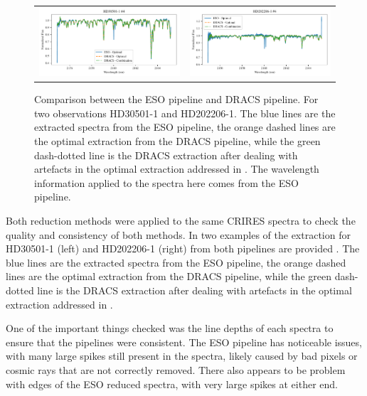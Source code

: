 \begin{figure}
\begin{tabular}{cc}
        \includegraphics[width=0.5\linewidth]{figures/reduction/pipeline_compare/pipeline_compare_HD30501-1_chip_4} & \includegraphics[width=0.5\linewidth]{figures/reduction/pipeline_compare/pipeline_compare_HD202206-1_chip_4}\\
    \end{tabular}
    \caption{Comparison between the {ESO} pipeline and {DRACS} pipeline. For two observations HD30501-1 and HD202206-1. The blue lines are the extracted spectra from the {ESO} pipeline, the orange dashed lines are the optimal extraction from the {DRACS} pipeline, while the green dash-dotted line is the {DRACS} extraction after dealing with artefacts in the optimal extraction addressed in . The wavelength information applied to the spectra here comes from the {ESO} pipeline.}
    \label{fig:reduction-comparison}
\end{figure}

Both reduction methods were applied to the same {CRIRES} spectra to check the quality and consistency of both methods.
In  two examples of the extraction for HD30501-1 (left) and HD202206-1 (right) from both pipelines are provided .
The blue lines are the extracted spectra from the {ESO} pipeline, the orange dashed lines are the optimal extraction from the {DRACS} pipeline, while the green dash-dotted line is the {DRACS} extraction after dealing with artefacts in the optimal extraction addressed in .

One of the important things checked was the line depths of each spectra to ensure that the pipelines were consistent. The {ESO} pipeline has noticeable issues, with many large spikes still present in the spectra, likely caused by bad pixels or cosmic rays that are not correctly removed. There also appears to be problem with edges of the {ESO} reduced spectra, with very large spikes at either end.

